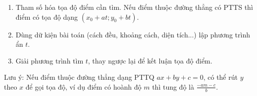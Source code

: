 \begin{enumerate}
\item Tham số hóa tọa độ điểm cần tìm. Nếu điểm thuộc đường thẳng có PTTS thì điểm có tọa độ dạng $(x_0+at; y_0+bt)$.
\item Dùng dữ kiện bài toán (cách đều, khoảng cách, diện tích...) lập phương trình ẩn $t$.
\item Giải phương trình tìm $t$, thay ngược lại để kết luận tọa độ điểm.
\end{enumerate}
Lưu ý: Nếu điểm thuộc đường thẳng dạng PTTQ $ax+by+c=0$, có thể rút $y$ theo $x$ để gọi tọa độ, ví dụ điểm có hoành độ $m$ thì tung độ là $\frac{-am-c}{b}$.
